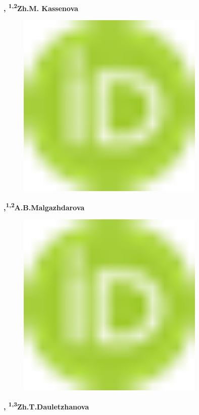 {\bfseries ,
\textsuperscript{1,2}Zh.M.
Kassenova}
\begin{figure}[H]
	\centering
	\includegraphics[width=0.8\textwidth]{media/chem2/image1}
	\caption*{}
\end{figure}
{\bfseries ,\textsuperscript{1,2}A.B.Malgazhdarova}
\begin{figure}[H]
	\centering
	\includegraphics[width=0.8\textwidth]{media/chem2/image1}
	\caption*{}
\end{figure}
{\bfseries ,
\textsuperscript{1,3}Zh.T.Dauletzhanova}
